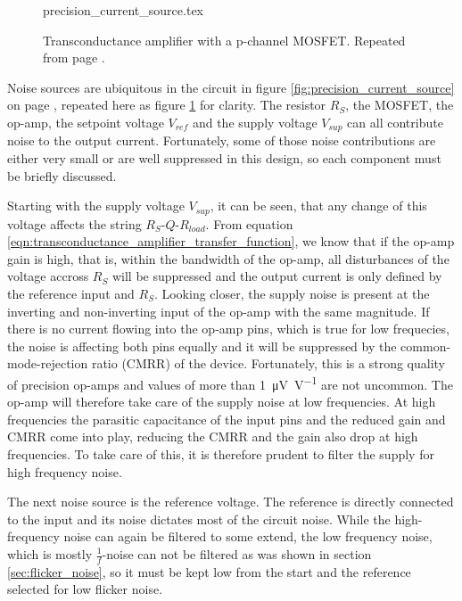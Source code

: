 \begin{figure}[ht]
    \centering
    {precision_current_source.tex}
    \caption{Transconductance amplifier with a p-channel MOSFET. Repeated from page \pageref{fig:precision_current_source}.}
    \label{fig:precision_current_source_noise}
\end{figure}

Noise sources are ubiquitous in the circuit in figure \ref{fig:precision_current_source} on page \pageref{fig:precision_current_source}, repeated here as figure \ref{fig:precision_current_source_noise} for clarity. The resistor $R_S$, the MOSFET, the op-amp, the setpoint voltage $V_{ref}$ and the supply voltage $V_{sup}$ can all contribute noise to the output current. Fortunately, some of those noise contributions are either very small or are well suppressed in this design, so each component must be briefly discussed.

Starting with the supply voltage $V_{sup}$, it can be seen, that any change of this voltage affects the string $R_S$-$Q$-$R_{load}$. From equation \ref{eqn:transconductance_amplifier_transfer_function}, we know that if the op-amp gain is high, that is, within the bandwidth of the op-amp, all disturbances of the voltage accross $R_S$ will be suppressed and the output current is only defined by the reference input and $R_S$. Looking closer, the supply noise is present at the inverting and non-inverting input of the op-amp with the same magnitude. If there is no current flowing into the op-amp pins, which is true for low frequecies, the noise is affecting both pins equally and it will be suppressed by the common-mode-rejection ratio (CMRR) of the device. Fortunately, this is a strong quality of precision op-amps and values of more than \qty[per-mode=power]{1}{\uV \per \volt} are not uncommon. The op-amp will therefore take care of the supply noise at low frequencies. At high frequencies the parasitic capacitance of the input pins and the reduced gain and CMRR come into play, reducing the CMRR and the gain also drop at high frequencies. To take care of this, it is therefore prudent to filter the supply for high frequency noise.

The next noise source is the reference voltage. The reference is directly connected to the input and its noise dictates most of the circuit noise. While the high-frequency noise can again be filtered to some extend, the low frequency noise, which is mostly $\frac{1}{f}$-noise can not be filtered as was shown in section \ref{sec:flicker_noise}, so it must be kept low from the start and the reference selected for low flicker noise.

